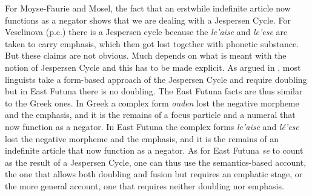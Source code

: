 ﻿\documentclass[output=paper,draft,draftmode,colorlinks,citecolor=brown]{langscibook}
\begin{document}
%
For Moyse-Faurie and Mosel, the fact that an erstwhile indefinite article
now functions as a negator shows that we are dealing with a Jespersen
Cycle. For Veselinova (p.c.) there is a Jespersen cycle because the
\textit{le'aise} and \textit{le'ese} are taken to carry emphasis, which
then got lost together with phonetic substance. But these claims are not
obvious. Much depends on what is meant with the notion of Jespersen Cycle
and this has to be made explicit. As argued in , most
linguists take a form-based approach of the Jespersen Cycle and require
doubling but in East Futuna there is no doubling. The East
Futuna facts are thus similar to the Greek ones. In Greek a
complex form \textit{ouden} lost the negative
morpheme and the emphasis, and it is the remains of a focus particle and a
numeral that now function as a negator. In East Futuna the complex forms
\textit{le'aise} and \textit{lé'ese} lost the negative morpheme and the
emphasis, and it is the remains of an indefinite article that now function
as a negator. As for East Futuna \textit{se} to count as the result of a
Jespersen Cycle, one can thus use the semantics-based account, the one
that allows both doubling and fusion but requires an emphatic stage, or the
more general account, one that requires neither doubling nor emphasis. 
\end{document}
